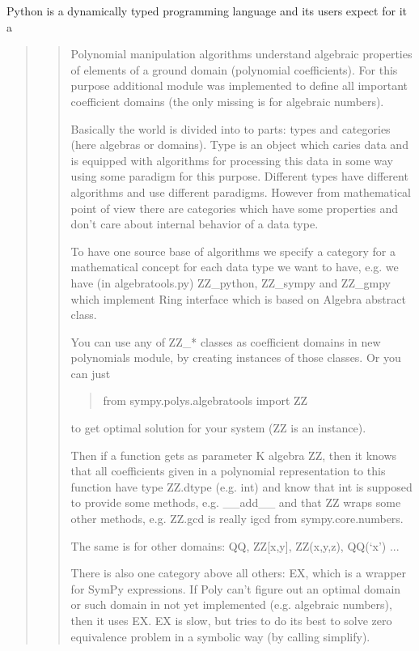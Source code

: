 Python is a dynamically typed programming language and its users expect for it a
\begin{quote}
\begin{quote}

Polynomial manipulation algorithms understand algebraic properties
of elements of a ground domain (polynomial coefficients). For this
purpose additional module was implemented to define all important
coefficient domains (the only missing is for algebraic numbers).

Basically the world is divided into to parts: types and categories
(here algebras or domains). Type is an object which caries data
and is equipped with algorithms for processing this data in some
way using some paradigm for this purpose. Different types have
different algorithms and use different paradigms. However from
mathematical point of view there are categories which have some
properties and don't care about internal behavior of a data type.

To have one source base of algorithms we specify a category for
a mathematical concept for each data type we want to have, e.g.
we have (in algebratools.py) ZZ\_python, ZZ\_sympy and ZZ\_gmpy
which implement Ring interface which is based on Algebra
abstract class.

You can use any of ZZ\_* classes as coefficient domains in new
polynomials module, by creating instances of those classes. Or
you can just
\begin{quote}

from sympy.polys.algebratools import ZZ
\end{quote}

to get optimal solution for your system (ZZ is an instance).

Then if a function gets as parameter K algebra ZZ, then it knows
that all coefficients given in a polynomial representation to this
function have type ZZ.dtype (e.g. int) and know that int is supposed
to provide some methods, e.g. \_\_add\_\_ and that ZZ wraps some other
methods, e.g. ZZ.gcd is really igcd from sympy.core.numbers.

The same is for other domains: QQ, ZZ{[}x,y{]}, ZZ(x,y,z), QQ(`x') ...

There is also one category above all others: EX, which is a wrapper
for SymPy expressions. If Poly can't figure out an optimal domain
or such domain in not yet implemented (e.g. algebraic numbers),
then it uses EX. EX is slow, but tries to do its best to solve
zero equivalence problem in a symbolic way (by calling simplify).


\end{quote}
\end{quote}

